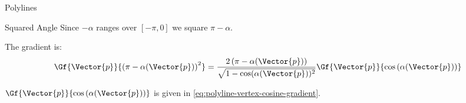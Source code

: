 \begin{plSection}{Polylines}
\begin{plSection}{Squared Angle}
Since $-\alpha$ ranges over $[-\pi,0]$
we square $\pi - \alpha$.

The gradient is:
\begin{equation}
\Gf{\Vector{p}}{\left( \pi - \alpha(\Vector{p}) \right)^2}
=
{{2 \left( \pi - \alpha(\Vector{p}) \right)}
\over
{\sqrt{ 1 - \cos(\alpha(\Vector{p}))^2}}}
\Gf{\Vector{p}}{\cos\left(\alpha(\Vector{p})\right)}
\end{equation}

$\Gf{\Vector{p}}{\cos \left( \alpha(\Vector{p}) \right)}$ is given
in \cref{eq:polyline-vertex-cosine-gradient}.

\end{plSection}%
\end{plSection}%
